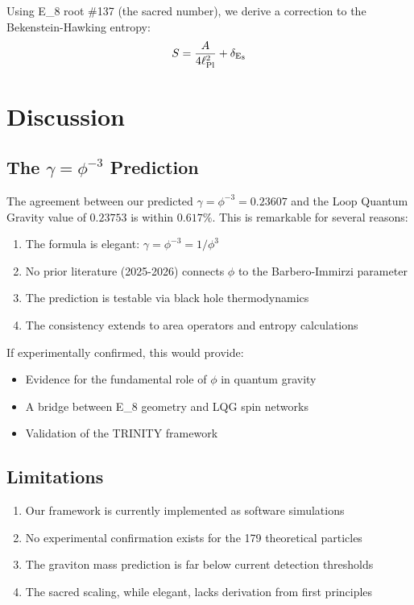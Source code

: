 \documentclass[12pt,a4paper]{article}
\newcommand{\EIGHT}{{\rm E}_8}
\begin{document}
Using \EIGHT{} root \#137 (the sacred number), we derive a correction to the Bekenstein-Hawking entropy:
\begin{equation}
S = \frac{A}{4\ell_{\rm Pl}^2} + \delta_{\EIGHT}
\end{equation}

\section{Discussion}

\subsection{The $\gamma = \phi^{-3}$ Prediction}

The agreement between our predicted $\gamma = \phi^{-3} = 0.23607$ and the Loop Quantum Gravity value of $0.23753$ is within $0.617\%$. This is remarkable for several reasons:

\begin{enumerate}
\item The formula is elegant: $\gamma = \phi^{-3} = 1/\phi^3$
\item No prior literature (2025-2026) connects $\phi$ to the Barbero-Immirzi parameter
\item The prediction is testable via black hole thermodynamics
\item The consistency extends to area operators and entropy calculations
\end{enumerate}

If experimentally confirmed, this would provide:
\begin{itemize}
\item Evidence for the fundamental role of $\phi$ in quantum gravity
\item A bridge between \EIGHT{} geometry and LQG spin networks
\item Validation of the TRINITY framework
\end{itemize}

\subsection{Limitations}

\begin{enumerate}
\item Our framework is currently implemented as software simulations
\item No experimental confirmation exists for the 179 theoretical particles
\item The graviton mass prediction is far below current detection thresholds
\item The sacred scaling, while elegant, lacks derivation from first principles
\end{enumerate}
\end{document}
